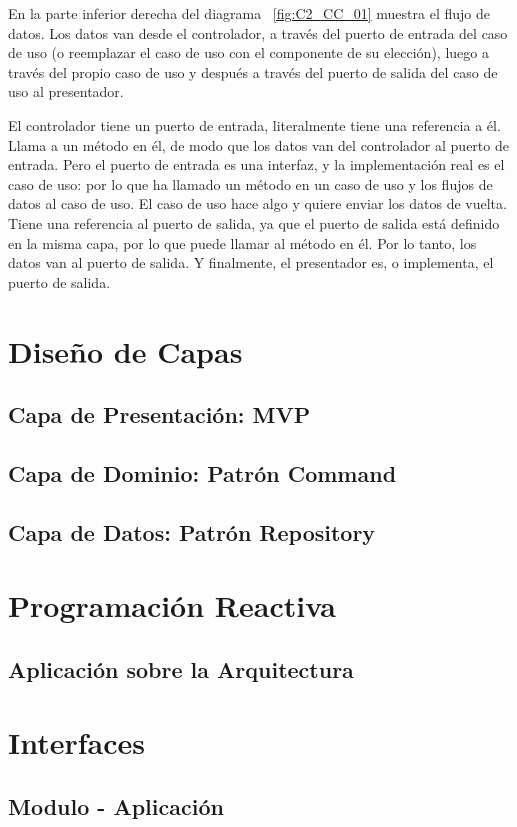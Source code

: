 En la parte inferior derecha del diagrama ~\ref{fig:C2_CC_01} muestra el flujo de datos. Los datos van desde el controlador, a través del puerto de entrada del caso de uso (o reemplazar el caso de uso con el componente de su elección), luego a través del propio caso de uso y después a través del puerto de salida del caso de uso al presentador.

El controlador tiene un puerto de entrada, literalmente tiene una referencia a él. Llama a un método en él, de modo que los datos van del controlador al puerto de entrada. Pero el puerto de entrada es una interfaz, y la implementación real es el caso de uso: por lo que ha llamado un método en un caso de uso y los flujos de datos al caso de uso. El caso de uso hace algo y quiere enviar los datos de vuelta. Tiene una referencia al puerto de salida, ya que el puerto de salida está definido en la misma capa, por lo que puede llamar al método en él. Por lo tanto, los datos van al puerto de salida. Y finalmente, el presentador es, o implementa, el puerto de salida.
\section{Diseño de Capas}
\subsection{Capa de Presentación: MVP}
\subsection{Capa de Dominio: Patrón Command}
\subsection{Capa de Datos: Patrón Repository}

\section{Programación Reactiva}
\subsection{Aplicación sobre la Arquitectura}

\section{Interfaces}
\subsection{Modulo - Aplicación}
